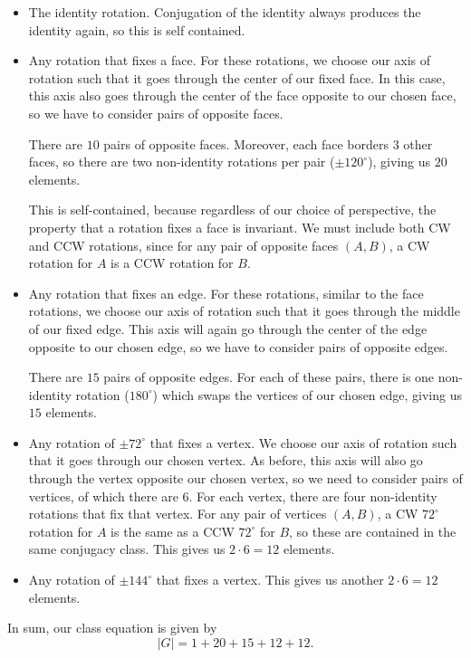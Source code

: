 \begin{itemize}
    \item The identity rotation. Conjugation of the identity always produces the identity again, so this is self contained.
    \item Any rotation that fixes a face. For these rotations, we choose our axis of rotation such that it goes through the center of our fixed face. In this case, this axis also goes through the center of the face opposite to our chosen face, so we have to consider pairs of opposite faces.
    
    There are $10$ pairs of opposite faces. Moreover, each face borders $3$ other faces, so there are two non-identity rotations per pair ($\pm 120^{\circ}$), giving us $20$ elements.
    
    This is self-contained, because regardless of our choice of perspective, the property that a rotation fixes a face is invariant. We must include both CW and CCW rotations, since for any pair of opposite faces $(A, B)$, a CW rotation for $A$ is a CCW rotation for $B$.
    \item Any rotation that fixes an edge. For these rotations, similar to the face rotations, we choose our axis of rotation such that it goes through the middle of our fixed edge. This axis will again go through the center of the edge opposite to our chosen edge, so we have to consider pairs of opposite edges. 
    
    There are $15$ pairs of opposite edges. For each of these pairs, there is one non-identity rotation ($180^{\circ}$) which swaps the vertices of our chosen edge, giving us $15$ elements. 
    \item Any rotation of $\pm 72^{\circ}$ that fixes a vertex. We choose our axis of rotation such that it goes through our chosen vertex. As before, this axis will also go through the vertex opposite our chosen vertex, so we need to consider pairs of vertices, of which there are $6$. For each vertex, there are four non-identity rotations that fix that vertex. For any pair of vertices $(A,B)$, a CW $72^{\circ}$ rotation for $A$ is the same as a CCW $72^{\circ}$ for $B$, so these are contained in the same conjugacy class. This gives us $2\cdot 6=12$ elements.
    \item Any rotation of $\pm 144^{\circ}$ that fixes a vertex. This gives us another $2\cdot 6 = 12$ elements. 
\end{itemize}

In sum, our class equation is given by 
\[\vert G\vert = 1 + 20 + 15 + 12 + 12.\]

